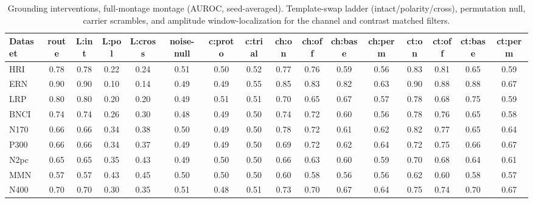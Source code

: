 \begin{table}[t]
\centering
\scriptsize
\setlength{\tabcolsep}{3pt}
\caption{Grounding interventions, full-montage montage (AUROC, seed-averaged). Template-swap ladder (intact/polarity/cross), permutation null, carrier scrambles, and amplitude window-localization for the channel and contrast matched filters.}
\label{tab:grounding-full}
\begin{tabular}{lccccccccccccccc}
\toprule
Dataset & route & L:int & L:pol & L:cross & noise-null & c:proto & c:trial & ch:on & ch:off & ch:base & ch:perm & ct:on & ct:off & ct:base & ct:perm \\
\midrule
HRI & 0.78 & 0.78 & 0.22 & 0.24 & 0.51 & 0.50 & 0.52 & 0.77 & 0.76 & 0.59 & 0.56 & 0.83 & 0.81 & 0.65 & 0.59 \\
ERN & 0.90 & 0.90 & 0.10 & 0.14 & 0.49 & 0.49 & 0.55 & 0.85 & 0.83 & 0.82 & 0.63 & 0.90 & 0.88 & 0.88 & 0.67 \\
LRP & 0.80 & 0.80 & 0.20 & 0.20 & 0.49 & 0.51 & 0.51 & 0.70 & 0.65 & 0.67 & 0.57 & 0.78 & 0.68 & 0.75 & 0.59 \\
BNCI & 0.74 & 0.74 & 0.26 & 0.30 & 0.48 & 0.49 & 0.50 & 0.74 & 0.72 & 0.60 & 0.56 & 0.78 & 0.76 & 0.65 & 0.58 \\
N170 & 0.66 & 0.66 & 0.34 & 0.38 & 0.50 & 0.49 & 0.50 & 0.78 & 0.72 & 0.61 & 0.62 & 0.82 & 0.77 & 0.65 & 0.64 \\
P300 & 0.66 & 0.66 & 0.34 & 0.37 & 0.49 & 0.49 & 0.50 & 0.69 & 0.72 & 0.62 & 0.64 & 0.72 & 0.75 & 0.66 & 0.67 \\
N2pc & 0.65 & 0.65 & 0.35 & 0.43 & 0.49 & 0.50 & 0.50 & 0.66 & 0.63 & 0.60 & 0.59 & 0.70 & 0.68 & 0.64 & 0.61 \\
MMN & 0.57 & 0.57 & 0.43 & 0.45 & 0.50 & 0.50 & 0.50 & 0.60 & 0.58 & 0.56 & 0.56 & 0.62 & 0.60 & 0.58 & 0.57 \\
N400 & 0.70 & 0.70 & 0.30 & 0.35 & 0.51 & 0.48 & 0.51 & 0.73 & 0.70 & 0.67 & 0.64 & 0.75 & 0.74 & 0.70 & 0.67 \\
\bottomrule
\end{tabular}
\end{table}
